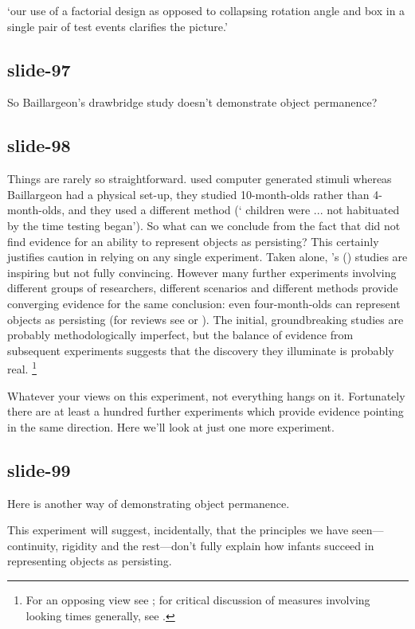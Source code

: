 \documentclass[12pt,\papersize]{extarticle}
\begin{document}
‘our use of a factorial design as opposed to collapsing rotation angle and
box in a single pair of test events clarifies the picture.’
\citep[p.~74]{sirois:2012_pupil}
 
\subsection{slide-97}
So Baillargeon’s drawbridge study doesn’t demonstrate object permanence?
 
\subsection{slide-98}
Things are rarely so straightforward.
\citeauthor{sirois:2012_pupil} used computer generated stimuli whereas Baillargeon had a physical set-up,  they studied 10-month-olds rather than 4-month-olds, and they used a different method (‘ children were ... not habituated by the time testing began’).
So what can we conclude from the fact that \citeauthor{sirois:2012_pupil}
did not find evidence for an ability to represent objects as persisting?
This certainly justifies caution in relying on any single experiment.
Taken alone, \citeauthor{baillargeon:1987_object}’s
(\citeyear{baillargeon:1987_object}) studies are inspiring but not fully
convincing.
However many further experiments involving different groups of researchers,
different scenarios and different methods provide converging evidence for
the same conclusion: even four-month-olds can represent objects as
persisting (for reviews see \citealp{Spelke:2001pg} or
\citealp{Baillargeon:2002hb}).
The initial, groundbreaking studies are probably methodologically
imperfect, but the balance of evidence from subsequent experiments suggests
that the discovery they illuminate is probably real.%
\footnote{
For an opposing view see \citet{schoner:2006_using}; for critical
discussion of measures involving looking times generally, see
\citet{aslin:2007_whats}.
}
 
Whatever your views on this experiment,
not everything hangs on it.
Fortunately there are at least a hundred further experiments which
provide evidence pointing in the same direction.
Here we'll look at just one more experiment.
 
\subsection{slide-99}
Here is another way of demonstrating object permanence.
 
This experiment will suggest, incidentally, that the principles we have seen---continuity,
rigidity and the rest---don't fully explain how infants succeed in representing objects as persisting.
 
\end{document}
